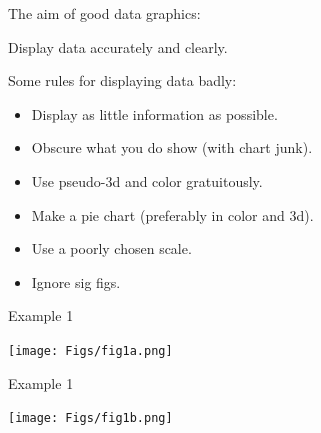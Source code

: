 \documentclass[12pt]{article}
\newcommand{\headsize}{\fontsize{35}{35} \selectfont}
\newcommand{\smallersize}{\fontsize{20}{25} \selectfont}
\begin{document}
\hfill \begin{minipage}[t]{10in}
The aim of good data graphics:

\vspace{10mm}

\hfill \begin{minipage}{9.5in}
\smallersize
\color{myblue} Display data accurately and clearly.
\end{minipage}

\vspace{30mm}

Some rules for displaying data badly:

\vspace{8mm}

\hfill \begin{minipage}{9.6in}
\color{myblue} \smallersize
\begin{itemize}
\item Display as little information as possible.
\item Obscure what you do show (with chart junk).
\item Use pseudo-3d and color gratuitously.
\item Make a pie chart (preferably in color and 3d).
\item Use a poorly chosen scale.
\item Ignore sig figs.
\end{itemize}
\end{minipage}
\end{minipage}

\newpage


\headsize \color{myyellow}
\hfill \begin{minipage}{5.75in}
\centering
Example 1
\end{minipage}

\vspace{30mm}

\centerline{\texttt{[image: Figs/fig1a.png]}}




\newpage


\headsize \color{myyellow}
\hfill \begin{minipage}{5.75in}
\centering
Example 1
\end{minipage}

\vspace{30mm}

\centerline{\texttt{[image: Figs/fig1b.png]}}



\newpage
\end{document}
